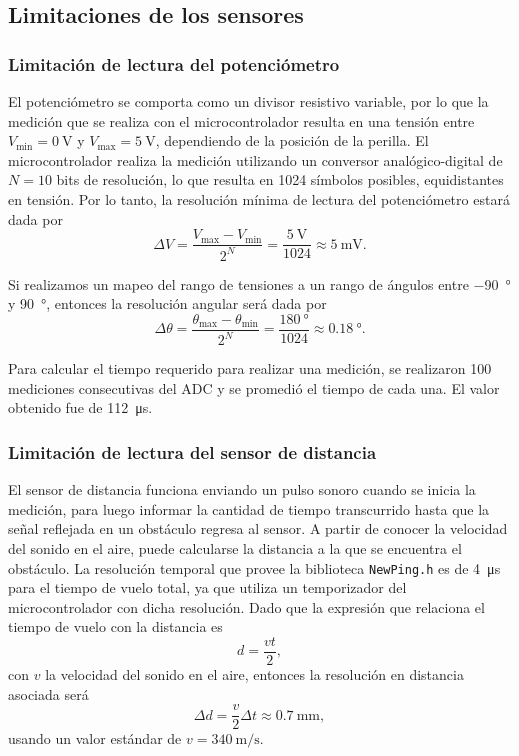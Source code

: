 \subsection{Limitaciones de los sensores}

\subsubsection{Limitación de lectura del potenciómetro}

El potenciómetro se comporta como un divisor resistivo variable, por lo que la medición que se realiza con el microcontrolador resulta en una tensión entre $V_{\min} = \qty{0}{\V}$ y $V_{\max} = \qty{5}{\V}$, dependiendo de la posición de la perilla. El microcontrolador realiza la medición utilizando un conversor analógico-digital de $N = 10$ bits de resolución, lo que resulta en 1024 símbolos posibles, equidistantes en tensión. Por lo tanto, la resolución mínima de lectura del potenciómetro estará dada por
\begin{equation*}
    \Delta V = \frac{V_{\max} - V_{\min}}{2^N} = \frac{\qty{5}{\V}}{1024} \approx \qty{5}{\mV}.
\end{equation*}

Si realizamos un mapeo del rango de tensiones a un rango de ángulos entre \qty{-90}{\degree} y \qty{90}{\degree}, entonces la resolución angular será dada por
\begin{equation*}
    \Delta \theta = \frac{\theta_{\max} - \theta_{\min}}{2^N} = \frac{\qty{180}{\degree}}{1024} \approx \qty{0.18}{\degree}.
\end{equation*}

Para calcular el tiempo requerido para realizar una medición, se realizaron 100 mediciones consecutivas del ADC y se promedió el tiempo de cada una. El valor obtenido fue de \qty{112}{\us}.

\subsubsection{Limitación de lectura del sensor de distancia}

El sensor de distancia funciona enviando un pulso sonoro cuando se inicia la medición, para luego informar la cantidad de tiempo transcurrido hasta que la señal reflejada en un obstáculo regresa al sensor. A partir de conocer la velocidad del sonido en el aire, puede calcularse la distancia a la que se encuentra el obstáculo. La resolución temporal que provee la biblioteca \verb|NewPing.h| es de \qty{4}{\us} para el tiempo de vuelo total, ya que utiliza un temporizador del microcontrolador con dicha resolución. Dado que la expresión que relaciona el tiempo de vuelo con la distancia es
\begin{equation*}
    d = \frac{v t}{2},
\end{equation*}
con $v$ la velocidad del sonido en el aire, entonces la resolución en distancia asociada será
\begin{equation}
    \label{eq:dist-tiempo-errores}
    \Delta d = \frac{v}{2} \Delta t \approx \qty{0.7}{\mm},
\end{equation}
usando un valor estándar de $v = \qty{340}{\m\per\s}$.

